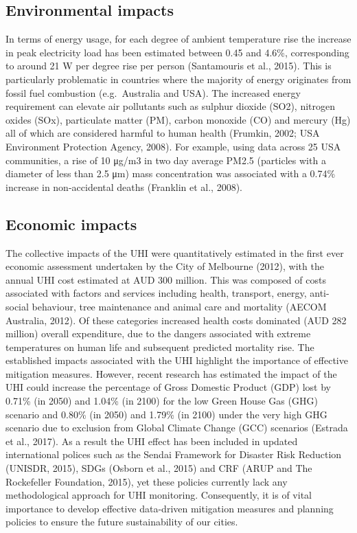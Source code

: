 \documentclass[]{book}
\begin{document}
\subsection{Environmental impacts}\label{environmental-impacts}

In terms of energy usage, for each degree of ambient temperature rise
the increase in peak electricity load has been estimated between 0.45
and 4.6\%, corresponding to around 21 W per degree rise per person
(Santamouris et al., 2015). This is particularly problematic in
countries where the majority of energy originates from fossil fuel
combustion (e.g.~Australia and USA). The increased energy requirement
can elevate air pollutants such as sulphur dioxide (SO2), nitrogen
oxides (SOx), particulate matter (PM), carbon monoxide (CO) and mercury
(Hg) all of which are considered harmful to human health (Frumkin, 2002;
USA Environment Protection Agency, 2008). For example, using data across
25 USA communities, a rise of 10 μg/m3 in two day average PM2.5
(particles with a diameter of less than 2.5 μm) mass concentration was
associated with a 0.74\% increase in non-accidental deaths (Franklin et
al., 2008).

\subsection{Economic impacts}\label{economic-impacts}

The collective impacts of the UHI were quantitatively estimated in the
first ever economic assessment undertaken by the City of Melbourne
(2012), with the annual UHI cost estimated at AUD 300 million. This was
composed of costs associated with factors and services including health,
transport, energy, anti-social behaviour, tree maintenance and animal
care and mortality (AECOM Australia, 2012). Of these categories
increased health costs dominated (AUD 282 million) overall expenditure,
due to the dangers associated with extreme temperatures on human life
and subsequent predicted mortality rise. The established impacts
associated with the UHI highlight the importance of effective mitigation
measures. However, recent research has estimated the impact of the UHI
could increase the percentage of Gross Domestic Product (GDP) lost by
0.71\% (in 2050) and 1.04\% (in 2100) for the low Green House Gas (GHG)
scenario and 0.80\% (in 2050) and 1.79\% (in 2100) under the very high
GHG scenario due to exclusion from Global Climate Change (GCC) scenarios
(Estrada et al., 2017). As a result the UHI effect has been included in
updated international polices such as the Sendai Framework for Disaster
Risk Reduction (UNISDR, 2015), SDGs (Osborn et al., 2015) and CRF (ARUP
and The Rockefeller Foundation, 2015), yet these policies currently lack
any methodological approach for UHI monitoring. Consequently, it is of
vital importance to develop effective data-driven mitigation measures
and planning policies to ensure the future sustainability of our cities.
\end{document}
